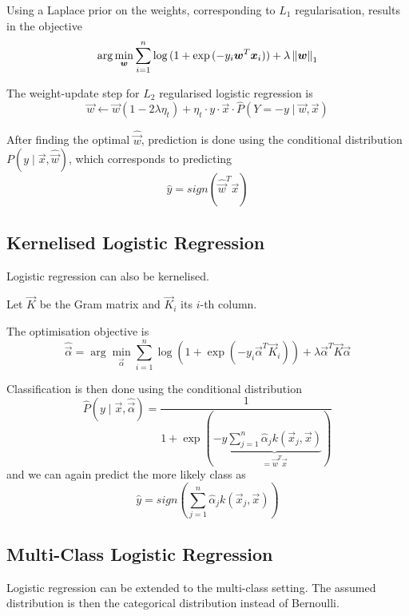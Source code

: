 Using a Laplace prior on the weights,
corresponding to $L_1$ regularisation,
results in the objective
\begin{equation*}
    \arg\min_{\boldsymbol{w}}{
        \sum_{i=1}^n{\log{(1 + \exp{(-y_i \boldsymbol{w}^T \boldsymbol{x}_i)})}}
        + \lambda \left\lVert\boldsymbol{w}\right\rVert_1
    }
\end{equation*}

The weight-update step for $L_2$ regularised
logistic regression is
\begin{equation*}
    \vec{w} \gets \vec{w}(1 - 2 \lambda \eta_t) + \eta_t \cdot y \cdot \vec{x} \cdot \hat{P}(Y = -y \mid \vec{w}, \vec{x})
\end{equation*}

After finding the optimal $\hat{\vec{w}}$,
prediction is done using the conditional
distribution $P(y \mid \vec{x}, \hat{\vec{w}})$,
which corresponds to predicting
\begin{equation*}
    \hat{y} = sign(\hat{\vec{w}}^T \vec{x})
\end{equation*}


\subsection{Kernelised Logistic Regression}
Logistic regression can also be kernelised.

Let $\vec{K}$ be the Gram matrix and
$\vec{K}_i$ its $i$-th column.

The optimisation objective is
\begin{equation*}
    \hat{\vec{\alpha}} = \arg\min_{\vec{\alpha}}{
        \sum_{i=1}^n{
            \log{\left( 1 + \exp{(-y_i \vec{\alpha}^T \vec{K}_i)} \right)}
            + \lambda \vec{\alpha}^T \vec{K} \vec{\alpha}
        }
    }
\end{equation*}

Classification is then done using the conditional distribution
\begin{equation*}
    \hat{P}(y \mid \vec{x}, \hat{\vec{\alpha}}) =
    \frac{1}{1 + \exp{(-y 
        \underbrace{\sum_{j=1}^n{\hat{\alpha}_j k(\vec{x}_j, \vec{x})}}_{= \vec{w}^T \vec{x}}
    )}}
\end{equation*}
and we can again predict the more likely class as
\begin{equation*}
    \hat{y} = sign\left(\sum_{j=1}^n{\hat{\alpha}_j k(\vec{x}_j, \vec{x})}\right)
\end{equation*}


\subsection{Multi-Class Logistic Regression}
Logistic regression can be extended to the
multi-class setting.
The assumed distribution is then
the categorical distribution instead
of Bernoulli.

